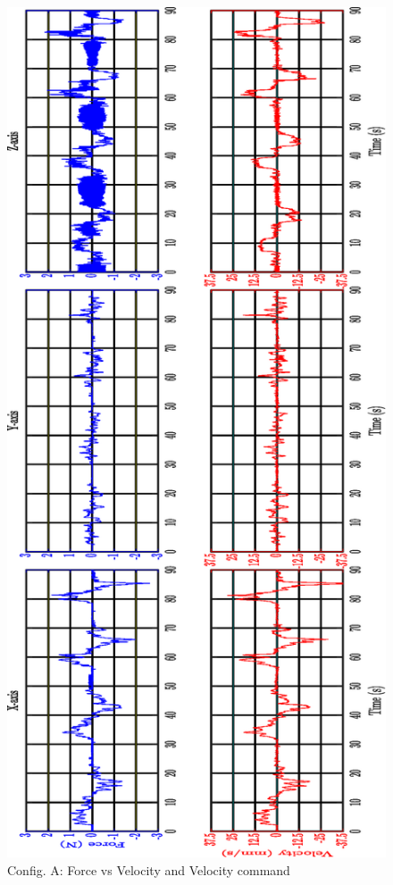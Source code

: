\begin{figure}[htbp]
\begin{center}
\includegraphics[width=0.7\linewidth]{Images/exp/ConfigA_2.eps}
\caption{Config. A: Force vs Velocity and Velocity command}
\label{fig: exp1_1_2}
\end{center}
\end{figure}

